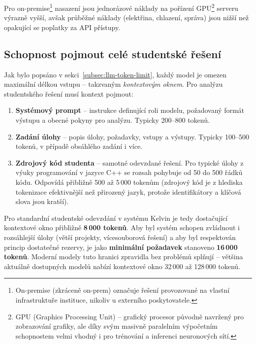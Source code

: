 Pro on-premise\footnote{On-premise (zkráceně on-prem) označuje řešení provozované na vlastní infrastruktuře instituce, nikoliv u externího poskytovatele.} nasazení jsou jednorázové náklady na pořízení GPU\footnote{GPU (Graphics Processing Unit) -- grafický procesor původně navržený pro zobrazování grafiky, ale díky svým masivně paralelním výpočetním schopnostem velmi vhodný i pro trénování a inferenci neuronových sítí.}
serveru výrazně vyšší, avšak průběžné náklady (elektřina, chlazení, správa) jsou nižší než opakující se poplatky za API přístupy.

\subsection{Schopnost pojmout celé studentské řešení}
\label{subsec:criteria-context-window}

Jak bylo popsáno v sekci~\ref{subsec:llm-token-limit}, každý model je omezen maximální délkou vstupu -- takzvaným \emph{kontextovým oknem}.
Pro analýzu studentského řešení musí kontext pojmout:

\begin{enumerate}
    \item \textbf{Systémový prompt} -- instrukce definující roli modelu, požadovaný formát výstupu a obecné pokyny pro analýzu.
    Typicky 200--800 tokenů.

    \item \textbf{Zadání úlohy} -- popis úlohy, požadavky, vstupy a výstupy.
    Typicky 100--500 tokenů, v případě obsáhlého zadání i více.

    \item \textbf{Zdrojový kód studenta} -- samotné odevzdané řešení.
    Pro typické úlohy z výuky programování v jazyce C++ se rozsah pohybuje od 50 do 500 řádků kódu.
    Odpovídá přibližně 500 až 5\,000 tokenům (zdrojový kód je z hlediska tokenizace efektivnější než přirozený jazyk, protože identifikátory a klíčová slova jsou kratší).
\end{enumerate}

Pro standardní studentské odevzdání v systému Kelvin je tedy dostačující kontextové okno přibližně \textbf{8\,000 tokenů}.
Aby byl systém schopen zvládnout i rozsáhlejší úlohy (větší projekty, vícesouborová řešení) a aby byl respektován princip dostatečné rezervy, je jako \textbf{minimální požadavek} stanoveno \textbf{16\,000 tokenů}.
Moderní modely tuto hranici zpravidla bez problémů splňují -- většina aktuálně dostupných modelů nabízí kontextové okno 32\,000 až 128\,000 tokenů.

